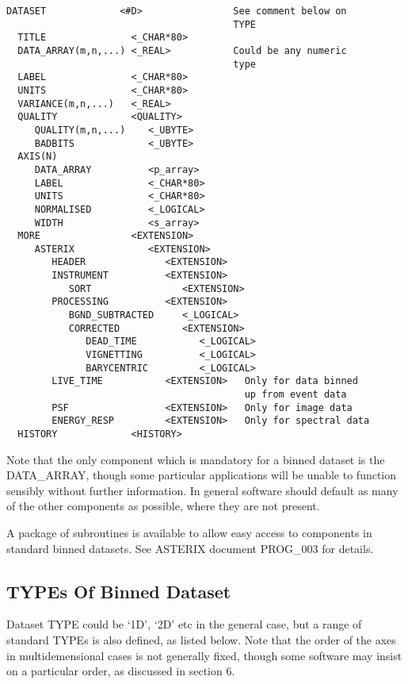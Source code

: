\begin{verbatim}
DATASET             <#D>                See comment below on 
                                        TYPE 
  TITLE               <_CHAR*80>                        
  DATA_ARRAY(m,n,...) <_REAL>           Could be any numeric
                                        type 
  LABEL               <_CHAR*80>        
  UNITS               <_CHAR*80>        
  VARIANCE(m,n,...)   <_REAL>
  QUALITY             <QUALITY>
     QUALITY(m,n,...)    <_UBYTE>
     BADBITS             <_UBYTE>
  AXIS(N)
     DATA_ARRAY          <p_array>
     LABEL               <_CHAR*80>
     UNITS               <_CHAR*80>
     NORMALISED          <_LOGICAL>
     WIDTH               <s_array>
  MORE                <EXTENSION>
     ASTERIX             <EXTENSION>
        HEADER              <EXTENSION>
        INSTRUMENT          <EXTENSION>
           SORT                <EXTENSION>   
        PROCESSING          <EXTENSION> 
           BGND_SUBTRACTED     <_LOGICAL>
           CORRECTED           <EXTENSION>
              DEAD_TIME           <_LOGICAL>
              VIGNETTING          <_LOGICAL>
              BARYCENTRIC         <_LOGICAL>
        LIVE_TIME           <EXTENSION>   Only for data binned
                                          up from event data 
        PSF                 <EXTENSION>   Only for image data 
        ENERGY_RESP         <EXTENSION>   Only for spectral data
  HISTORY             <HISTORY>
\end{verbatim}

Note that the only component which is mandatory for a  binned  dataset
is  the DATA\_ARRAY, though some particular applications will be unable
to function sensibly without further information.  In general software
should default as many of the other components as possible, where they
are not present.

A package  of  subroutines  is  available  to  allow  easy  access  to
components in standard binned datasets.  See ASTERIX document PROG\_003
for details.

\subsection{TYPEs Of Binned Dataset}

Dataset TYPE could be `1D', `2D' etc in the general case, but a  range
of  standard  TYPEs  is  also defined, as listed below.  Note that the
order of the axes in multidemensional cases is  not  generally  fixed,
though some software may insist on a particular order, as discussed in
section 6.

